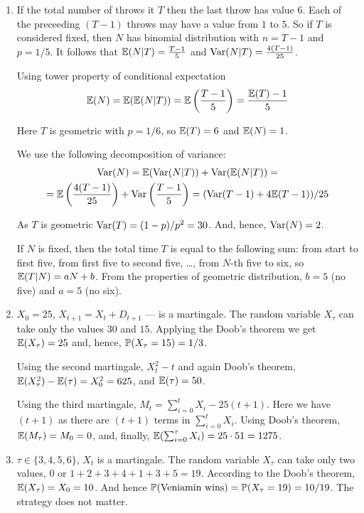 \documentclass[12pt, a4paper]{article}
\begin{document}
\begin{enumerate}
\item If the total number of throws it $T$ then the last throw has value $6$. Each of the preceeding $(T-1)$ throws may have a value from $1$ to $5$. So if $T$ is considered fixed, then $N$ has binomial distribution with $n=T-1$ and $p=1/5$. It follows that $\E(N|T)=\frac{T-1}{5}$ and $\Var(N|T)=\frac{4(T-1)}{25}$.

Using tower property of conditional expectation
\[
\E(N)=\E(\E(N|T))=\E\left( \frac{T-1}{5} \right)=\frac{\E(T)-1}{5}
\]

Here $T$ is geometric with $p=1/6$, so $\E(T)=6$ and $\E(N)=1$.

We use the following decomposition of variance:
\begin{multline}
\Var(N)=\E(\Var(N|T))+\Var(\E(N|T))=\\
=\E\left(\frac{4(T-1)}{25}\right)+\Var\left(\frac{T-1}{5}\right)=(\Var(T-1)+4\E(T-1))/25
\end{multline}

As $T$ is geometric $\Var(T)=(1-p)/p^2=30$. And, hence, $\Var(N)=2$.

If $N$ is fixed, then the total time $T$ is equal to the following sum: from start to first five, from first five to second five, \ldots, from $N$-th five to six, so $\E(T|N)=aN+b$. From the properties of geometric distribution, $b=5$ (no five) and $a=5$ (no six).

\item $X_0=25$, $X_{t+1}=X_t + D_{t+1}$ — is a martingale. The random variable $X_{\tau}$ can take only the values $30$ and $15$. Applying the Doob's theorem we get $\E(X_{\tau})=25$ and, hence, $\P(X_{\tau}=15)=1/3$.

Using the second martingale, $X^2_t-t$ and again Doob's theorem, $\E(X^2_{\tau})-\E(\tau)=X_0^2=625$, and $\E(\tau)=50$.

Using the third martingale, $M_t=\sum_{i=0}^t X_i - 25(t+1)$. Here we have $(t+1)$ as there are $(t+1)$ terms in $\sum_{i=0}^t X_i$. Using Doob's theorem, $\E(M_{\tau})=M_0=0$, and, finally, $\E(\sum_{i=0}^{\tau} X_i )=25\cdot 51=1275$.

\item $\tau \in \{3,4,5,6\}$, $X_t$ is a martingale. The random variable $X_{\tau}$ can take only two values, $0$ or $1+2+3+4+1+3+5=19$. According to the Doob's theorem, $\E(X_{\tau})=X_0=10$. And hence $\P(\text{Veniamin wins})=\P(X_{\tau}=19)=10/19$. The strategy does not matter.


\end{enumerate}
\end{document}
